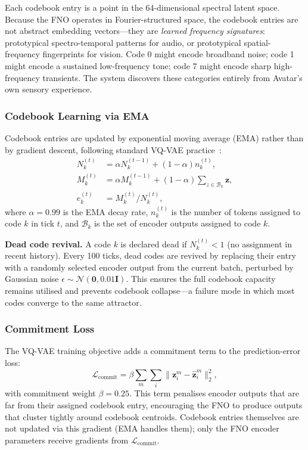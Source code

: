 Each codebook entry is a point in the 64-dimensional spectral latent space.
Because the FNO operates in Fourier-structured space, the codebook entries are not
abstract embedding vectors---they are \emph{learned frequency signatures}: prototypical
spectro-temporal patterns for audio, or prototypical spatial-frequency fingerprints for
vision.
Code 0 might encode broadband noise; code 1 might encode a sustained low-frequency
tone; code 7 might encode sharp high-frequency transients.
The system discovers these categories entirely from Avatar's own sensory experience.

\subsubsection{Codebook Learning via EMA}
\label{sec:ema_updates}

Codebook entries are updated by exponential moving average (EMA) rather than by
gradient descent, following standard VQ-VAE practice~\cite{vqvae2017}:
\begin{align}
N_k^{(t)} &= \alpha N_k^{(t-1)} + (1-\alpha) n_k^{(t)}, \label{eq:ema_n} \\
M_k^{(t)} &= \alpha M_k^{(t-1)} + (1-\alpha) \sum_{z \in \mathcal{B}_k} \mathbf{z}, \label{eq:ema_m} \\
e_k^{(t)} &= M_k^{(t)} / N_k^{(t)}, \label{eq:ema_update}
\end{align}
where $\alpha = 0.99$ is the EMA decay rate, $n_k^{(t)}$ is the number of tokens
assigned to code $k$ in tick $t$, and $\mathcal{B}_k$ is the set of encoder outputs
assigned to code $k$.

\textbf{Dead code revival.}
A code $k$ is declared dead if $N_k^{(t)} < 1$ (no assignment in recent history).
Every 100 ticks, dead codes are revived by replacing their entry with a randomly
selected encoder output from the current batch, perturbed by Gaussian noise
$\epsilon \sim \mathcal{N}(\mathbf{0}, 0.01 \mathbf{I})$.
This ensures the full codebook capacity remains utilised and prevents codebook
collapse---a failure mode in which most codes converge to the same attractor.

\subsubsection{Commitment Loss}

The VQ-VAE training objective adds a commitment term to the prediction-error loss:
\begin{equation}
\mathcal{L}_{\mathrm{commit}} = \beta \sum_{m} \sum_{i} \| \mathbf{z}_i^m - \hat{\mathbf{z}}_i^m \|_2^2,
\label{eq:commit}
\end{equation}
with commitment weight $\beta = 0.25$.
This term penalises encoder outputs that are far from their assigned codebook entry,
encouraging the FNO to produce outputs that cluster tightly around codebook centroids.
Codebook entries themselves are not updated via this gradient (EMA handles them);
only the FNO encoder parameters receive gradients from $\mathcal{L}_{\mathrm{commit}}$.

